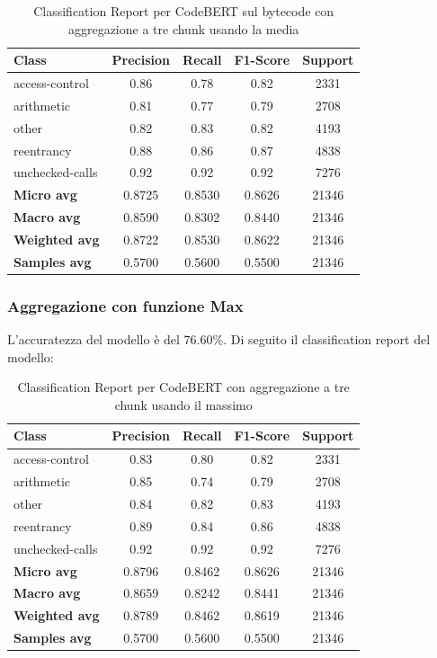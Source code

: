 \documentclass[../../Thesis.tex]{subfiles}
\begin{document}
    \begin{table}[H]
        \centering
        \small
        \begin{tabular}{lcccc}
        \hline
        \textbf{Class} & \textbf{Precision} & \textbf{Recall} & \textbf{F1-Score} & \textbf{Support} \\
        \hline
        access-control & 0.86 & 0.78 & 0.82 & 2331 \\
        arithmetic & 0.81 & 0.77 & 0.79 & 2708 \\
        other & 0.82 & 0.83 & 0.82 & 4193 \\
        reentrancy & 0.88 & 0.86 & 0.87 & 4838 \\
        unchecked-calls & 0.92 & 0.92 & 0.92 & 7276 \\
        \hline
        \textbf{Micro avg} & 0.8725 & 0.8530 & 0.8626 & 21346 \\
        \textbf{Macro avg} & 0.8590 & 0.8302 & 0.8440 & 21346 \\
        \textbf{Weighted avg} & 0.8722 & 0.8530 & 0.8622 & 21346 \\
        \textbf{Samples avg} & 0.5700 & 0.5600 & 0.5500 & 21346 \\
        \hline
        \end{tabular}
        \caption{Classification Report per CodeBERT sul bytecode con aggregazione a tre chunk usando la media}
    \end{table}
        
        
    
\subsubsection{Aggregazione con funzione Max}
L'accuratezza del modello è del 76.60\%. Di seguito il classification report del modello:
\begin{table}[H]
\centering
\small
\begin{tabular}{lcccc}
\hline
\textbf{Class} & \textbf{Precision} & \textbf{Recall} & \textbf{F1-Score} & \textbf{Support} \\
\hline
access-control & 0.83 & 0.80 & 0.82 & 2331 \\
arithmetic & 0.85 & 0.74 & 0.79 & 2708 \\
other & 0.84 & 0.82 & 0.83 & 4193 \\
reentrancy & 0.89 & 0.84 & 0.86 & 4838 \\
unchecked-calls & 0.92 & 0.92 & 0.92 & 7276 \\
\hline
\textbf{Micro avg} & 0.8796 & 0.8462 & 0.8626 & 21346 \\
\textbf{Macro avg} & 0.8659 & 0.8242 & 0.8441 & 21346 \\
\textbf{Weighted avg} & 0.8789 & 0.8462 & 0.8619 & 21346 \\
\textbf{Samples avg} & 0.5700 & 0.5600 & 0.5500 & 21346 \\
\hline
\end{tabular}
\caption{Classification Report per CodeBERT con aggregazione a tre chunk usando il massimo}
\end{table}
\end{document}

